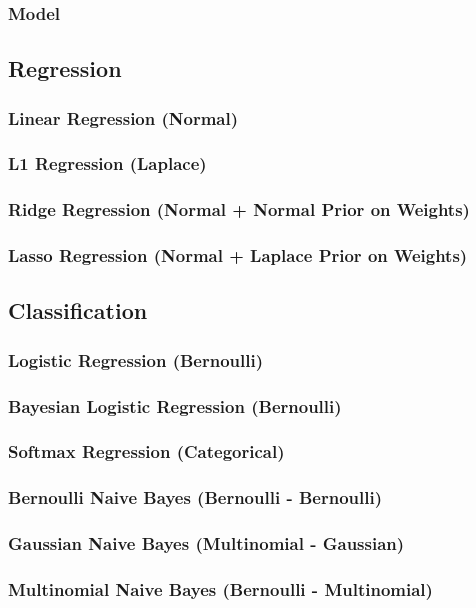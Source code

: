 \documentclass{article}
\begin{document}
\subsubsection{Model}

\subsection{Regression}
\subsubsection{Linear Regression (Normal)}
\subsubsection{L1 Regression (Laplace)}
\subsubsection{Ridge Regression (Normal + Normal Prior on Weights)}
\subsubsection{Lasso Regression (Normal + Laplace Prior on Weights)}

\subsection{Classification}
\subsubsection{Logistic Regression (Bernoulli)}
\subsubsection{Bayesian Logistic Regression (Bernoulli)}
\subsubsection{Softmax Regression (Categorical)}
\subsubsection{Bernoulli Naive Bayes (Bernoulli - Bernoulli)}
\subsubsection{Gaussian Naive Bayes (Multinomial - Gaussian)}
\subsubsection{Multinomial Naive Bayes (Bernoulli - Multinomial)}
\end{document}
